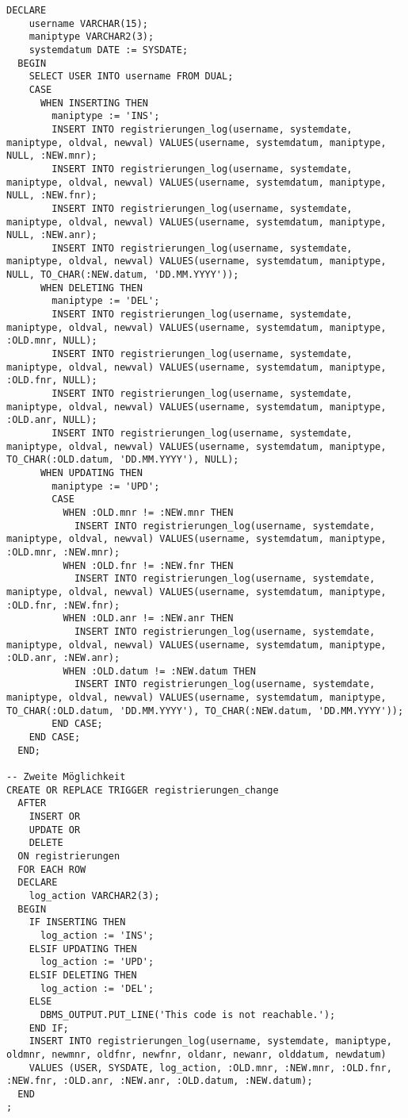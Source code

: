 \documentclass[a4paper,10pt,titlepage=false]{scrreprt}
\begin{document}
\begin{itemize}
\begin{lstlisting}[style=sql, title=Trigger]
  DECLARE 
    username VARCHAR(15);
    maniptype VARCHAR2(3);
    systemdatum DATE := SYSDATE;
  BEGIN
    SELECT USER INTO username FROM DUAL;
    CASE
      WHEN INSERTING THEN
        maniptype := 'INS';
        INSERT INTO registrierungen_log(username, systemdate, maniptype, oldval, newval) VALUES(username, systemdatum, maniptype, NULL, :NEW.mnr);
        INSERT INTO registrierungen_log(username, systemdate, maniptype, oldval, newval) VALUES(username, systemdatum, maniptype, NULL, :NEW.fnr);
        INSERT INTO registrierungen_log(username, systemdate, maniptype, oldval, newval) VALUES(username, systemdatum, maniptype, NULL, :NEW.anr);
        INSERT INTO registrierungen_log(username, systemdate, maniptype, oldval, newval) VALUES(username, systemdatum, maniptype, NULL, TO_CHAR(:NEW.datum, 'DD.MM.YYYY'));
      WHEN DELETING THEN
        maniptype := 'DEL';
        INSERT INTO registrierungen_log(username, systemdate, maniptype, oldval, newval) VALUES(username, systemdatum, maniptype, :OLD.mnr, NULL);
        INSERT INTO registrierungen_log(username, systemdate, maniptype, oldval, newval) VALUES(username, systemdatum, maniptype, :OLD.fnr, NULL);
        INSERT INTO registrierungen_log(username, systemdate, maniptype, oldval, newval) VALUES(username, systemdatum, maniptype, :OLD.anr, NULL);
        INSERT INTO registrierungen_log(username, systemdate, maniptype, oldval, newval) VALUES(username, systemdatum, maniptype, TO_CHAR(:OLD.datum, 'DD.MM.YYYY'), NULL);
      WHEN UPDATING THEN
        maniptype := 'UPD';
        CASE
          WHEN :OLD.mnr != :NEW.mnr THEN
            INSERT INTO registrierungen_log(username, systemdate, maniptype, oldval, newval) VALUES(username, systemdatum, maniptype, :OLD.mnr, :NEW.mnr);
          WHEN :OLD.fnr != :NEW.fnr THEN
            INSERT INTO registrierungen_log(username, systemdate, maniptype, oldval, newval) VALUES(username, systemdatum, maniptype, :OLD.fnr, :NEW.fnr);
          WHEN :OLD.anr != :NEW.anr THEN
            INSERT INTO registrierungen_log(username, systemdate, maniptype, oldval, newval) VALUES(username, systemdatum, maniptype, :OLD.anr, :NEW.anr);
          WHEN :OLD.datum != :NEW.datum THEN
            INSERT INTO registrierungen_log(username, systemdate, maniptype, oldval, newval) VALUES(username, systemdatum, maniptype, TO_CHAR(:OLD.datum, 'DD.MM.YYYY'), TO_CHAR(:NEW.datum, 'DD.MM.YYYY'));
        END CASE;
    END CASE;
  END;

-- Zweite Möglichkeit
CREATE OR REPLACE TRIGGER registrierungen_change
  AFTER 
    INSERT OR
    UPDATE OR
    DELETE
  ON registrierungen
  FOR EACH ROW
  DECLARE
    log_action VARCHAR2(3);
  BEGIN
    IF INSERTING THEN
      log_action := 'INS';
    ELSIF UPDATING THEN
      log_action := 'UPD';
    ELSIF DELETING THEN
      log_action := 'DEL';
    ELSE
      DBMS_OUTPUT.PUT_LINE('This code is not reachable.');
    END IF;
    INSERT INTO registrierungen_log(username, systemdate, maniptype, oldmnr, newmnr, oldfnr, newfnr, oldanr, newanr, olddatum, newdatum) 
    VALUES (USER, SYSDATE, log_action, :OLD.mnr, :NEW.mnr, :OLD.fnr, :NEW.fnr, :OLD.anr, :NEW.anr, :OLD.datum, :NEW.datum);
  END
;
\end{lstlisting}

\end{itemize}
\end{document}
